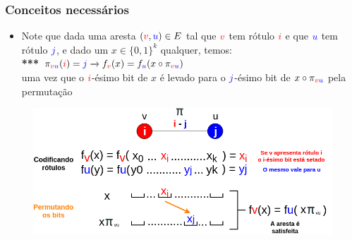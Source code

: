 \documentclass[11pt, handout]{beamer}
\newcommand{\red}[1]{\textcolor{red}{#1}}
\newcommand{\blue}[1]{\textcolor{blue}{#1}}
\begin{document}
\begin{frame}[<+->]
\frametitle{Conceitos necessários}
    \begin{itemize}
    \item Note que dada uma aresta $(\red{v},\blue{u})\in E$ tal que $\red{v}$ tem rótulo $\red{i}$ e que  $\blue{u}$ tem rótulo $\blue{j}$, e dado um $x\in \{0,1\}^k$ qualquer, temos:\\
    \textbf{***}  $ \pi_{\red{v}\blue{u}}(\red{i}) = \blue{j} \xrightarrow{} f_{\red{v}}(x)=f_{\blue{u}}(x\circ \pi_{\red{v}\blue{u}})$\\ uma vez que o $\red{i}$-ésimo bit de $x$ é levado para o $\blue{j}$-ésimo bit de $x\circ \pi_{\red{v}\blue{u}}$ pela permutação
    \end{itemize}
    \begin{figure}
        \includegraphics[width=1\textwidth]{images/satisfied.png}
    \end{figure}{}
\end{frame}{}
\end{document}
